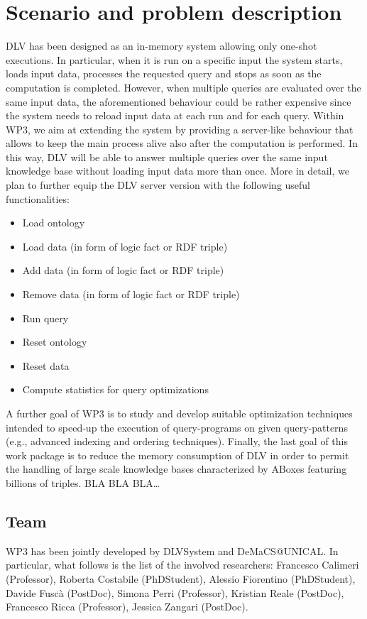 \documentclass[oneside]{book}
\begin{document}
\chapter{Scenario and problem description}

DLV has been designed as an in-memory system allowing only one-shot executions. In particular, when it is run on a specific input the system starts, loads input data, processes the requested query and stops as soon as the computation is completed. However, when multiple queries are evaluated over the same input data, the aforementioned behaviour could be rather expensive since the system needs to reload input data at each run and for each query. Within WP3, we aim at extending the system by providing a server-like behaviour that allows to keep the main process alive also after the computation is performed. In this way, DLV will be able to answer multiple queries over the same input knowledge base without loading input data more than once. More in detail, we plan to further equip the DLV server version with the following useful functionalities:
\begin{itemize}
\item Load ontology
\item Load data (in form of logic fact or RDF triple)
\item Add data (in form of logic fact or RDF triple)
\item Remove data (in form of logic fact or RDF triple)
\item Run query
\item Reset ontology
\item Reset data
\item Compute statistics for query optimizations
\end{itemize}

A further goal of WP3 is to study and develop suitable optimization techniques intended to speed-up the execution of query-programs on given query-patterns (e.g., advanced indexing and ordering techniques). Finally, the last goal of this work package is to reduce the memory consumption of DLV in order to permit the handling of large scale knowledge bases characterized by ABoxes featuring billions of triples.
BLA BLA BLA… 



\section{Team}
WP3 has been jointly developed by DLVSystem and DeMaCS@UNICAL. In particular, what follows is the list of the involved researchers: Francesco Calimeri (Professor), Roberta Costabile (PhDStudent), Alessio Fiorentino (PhDStudent), Davide Fuscà (PostDoc), Simona Perri (Professor), Kristian Reale (PostDoc), Francesco Ricca (Professor), Jessica Zangari (PostDoc).
\end{document}

